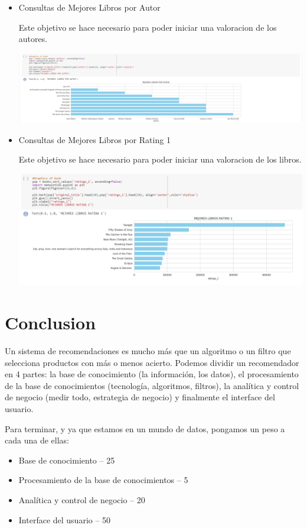 \documentclass[preprint,12pt]{elsarticle}
\begin{document}
\begin{itemize}
\item Consultas de Mejores Libros por Autor 

Este objetivo se hace necesario para poder iniciar una valoracion de los autores.

\begin {center}
\includegraphics[scale= 0.40]{./Imagenes/mejores_libros_p_autor.png}
\end {center}


\item Consultas de Mejores Libros por Rating 1

Este objetivo se hace necesario para poder iniciar una valoracion de los libros.

\begin {center}
\includegraphics[scale= 0.50]{./Imagenes/mejores_libros_rating_1.png}
\end {center}


\end{itemize}


\section{Conclusion}
Un sistema de recomendaciones es mucho más que un algoritmo o un filtro que selecciona productos con más o menos acierto. Podemos dividir un recomendador en 4 partes: la base de conocimiento (la información, los datos), el procesamiento de la base de conocimientos (tecnología, algoritmos, filtros), la analítica y control de negocio (medir todo, estrategia de negocio) y finalmente el interface del usuario.

Para terminar, y ya que estamos en un mundo de datos, pongamos un peso a cada una de ellas:
\begin{itemize}
	\item Base de conocimiento – 25%
	\item Procesamiento de la base de conocimientos – 5%
	\item Analítica y control de negocio – 20%
	\item Interface del usuario – 50%
\end{itemize}
\end{document}
